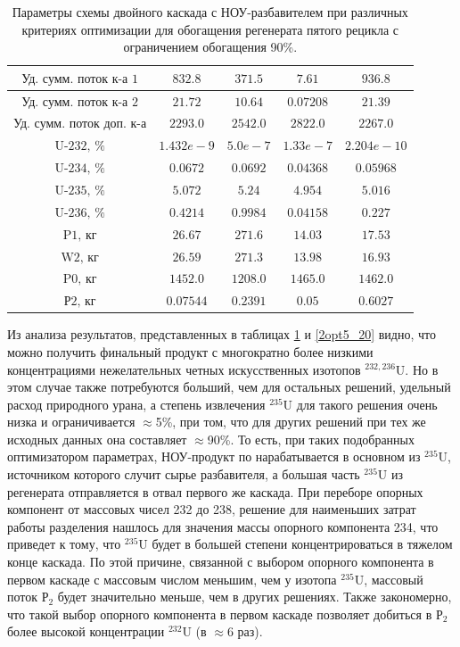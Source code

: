 \begin{table}
\begin{tabular}{ccccc}
        $\text{Уд. сумм. поток к-а 1}$ & $832.8$ & $371.5$ & $7.61$ & $936.8$\\ \hline
        $\text{Уд. сумм. поток к-а 2}$ & $21.72$ & $10.64$ & $0.07208$ & $21.39$\\ \hline
        $\text{Уд. сумм. поток доп. к-а}$ & $2293.0$ & $2542.0$ & $2822.0$ & $2267.0$\\ \hline
        $\text{U-232, \%}$ & $1.432e-9$ & $5.0e-7$ & $1.33e-7$ & $2.204e-10$\\ \hline
        $\text{U-234, \%}$ & $0.0672$ & $0.0692$ & $0.04368$ & $0.05968$\\ \hline
        $\text{U-235, \%}$ & $5.072$ & $5.24$ & $4.954$ & $5.016$\\ \hline
        $\text{U-236, \%}$ & $0.4214$ & $0.9984$ & $0.04158$ & $0.227$\\ \hline
        $\text{P1, кг}$ & $26.67$ & $271.6$ & $14.03$ & $17.53$\\ \hline
        $\text{W2, кг}$ & $26.59$ & $271.3$ & $13.98$ & $16.93$\\ \hline
        $\text{P0, кг}$ & $1452.0$ & $1208.0$ & $1465.0$ & $1462.0$\\ \hline
        $\text{Р2, кг}$ & $0.07544$ & $0.2391$ & $0.05$ & $0.6027$\\ \hline
    \end{tabular}                       
\caption{Параметры схемы двойного каскада с НОУ-разбавителем при различных критериях оптимизации для обогащения регенерата пятого рецикла с ограничением обогащения 90\%.{\label{2opt5_90}}}
\end{table}

Из анализа результатов, представленных в таблицах \ref{2opt5_90} и \ref{2opt5_20} видно, что можно получить финальный продукт с многократно более низкими концентрациями нежелательных четных искусственных  изотопов $^{232,236}$U. Но в этом случае также потребуются больший, чем для остальных решений, удельный расход природного урана, а степень извлечения $^{235}$U для такого решения очень низка и ограничивается $\approx$5\%, при том, что для других решений при тех же исходных данных она составляет $\approx$90\%. То есть, при таких подобранных оптимизатором параметрах, НОУ-продукт по нарабатывается в основном из $^{235}$U, источником которого случит сырье разбавителя, а большая часть $^{235}$U из регенерата отправляется в отвал первого же каскада. При переборе опорных компонент от массовых чисел 232 до 238, решение для наименьших затрат работы разделения нашлось для значения массы опорного компонента 234, что приведет к тому, что $^{235}$U будет в большей степени концентрироваться в тяжелом конце каскада. По этой причине, связанной с выбором опорного компонента в первом каскаде с массовым числом меньшим, чем у изотопа $^{235}$U, массовый поток $Р_2$ будет значительно меньше, чем в других решениях. Также закономерно, что такой выбор опорного компонента в первом каскаде позволяет добиться в $Р_2$ более высокой концентрации $^{232}$U (в $\approx$6 раз).


